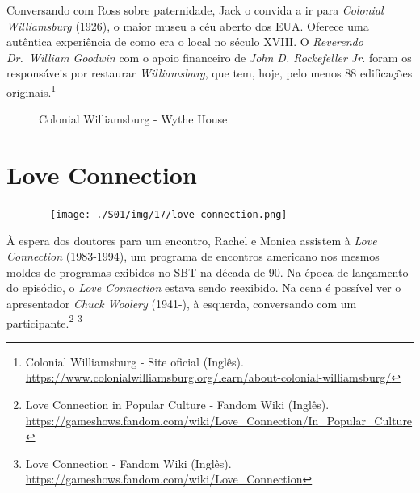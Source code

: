 Conversando com Ross sobre paternidade, Jack o convida a ir para
\emph{Colonial Williamsburg} (1926), o maior museu a céu aberto dos EUA.
Oferece uma autêntica experiência de como era o local no século XVIII. O
\emph{Reverendo Dr.~William Goodwin} com o apoio financeiro de
\emph{John D. Rockefeller Jr.} foram os responsáveis por restaurar
\emph{Williamsburg}, que tem, hoje, pelo menos 88 edificações
originais.\footnote{\sloppy Colonial Williamsburg - Site oficial (Inglês). \url{https://www.colonialwilliamsburg.org/learn/about-colonial-williamsburg/}}

\begin{figure}
  \centering
    \caption{Colonial Williamsburg - Wythe House\label{fig:colonial-williamsburg-wythe-house}}
\end{figure}

\hypertarget{love-connection}{%
\section{Love Connection}\label{love-connection}}

\begin{figure}[!ht]
  \begin{adjustwidth}{-\oddsidemargin-1in}{-\rightmargin}
    \centering
    \texttt{[image: ./S01/img/17/love-connection.png]}
  \end{adjustwidth}
\end{figure}

À espera dos doutores para um encontro, Rachel e Monica assistem à
\emph{Love Connection} (1983-1994), um programa de encontros americano
nos mesmos moldes de programas exibidos no SBT na década de 90. Na época
de lançamento do episódio, o \emph{Love Connection} estava sendo
reexibido. Na cena é possível ver o apresentador \emph{Chuck Woolery}
(1941-), à esquerda, conversando com um participante.\footnote{\sloppy Love Connection in Popular Culture - Fandom Wiki (Inglês). \url{https://gameshows.fandom.com/wiki/Love_Connection/In_Popular_Culture}}
\footnote{\sloppy Love Connection - Fandom Wiki (Inglês). \url{https://gameshows.fandom.com/wiki/Love_Connection}}


